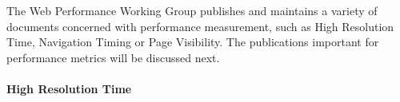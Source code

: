 The Web Performance Working Group publishes and maintains a variety of documents concerned with performance measurement, such as High Resolution Time, Navigation Timing or Page Visibility. %
The publications important for performance metrics will be discussed next.















\paragraph{High Resolution Time}








